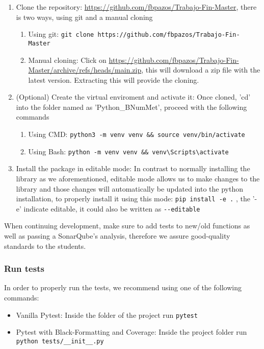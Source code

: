 \begin{enumerate}
       \item Clone the repository: \href{https://github.com/fbpazos/Trabajo-Fin-Master}{https://github.com/fbpazos/Trabajo-Fin-Master}, there is two ways, using git and a manual cloning
    \begin{enumerate}
        \item Using git: \lstinline|git clone https://github.com/fbpazos/Trabajo-Fin-Master|
        
        \item Manual cloning: Click on \href{https://github.com/fbpazos/Trabajo-Fin-Master/archive/refs/heads/main.zip}{https://github.com/fbpazos/Trabajo-Fin-Master/archive/refs/heads/main.zip}, this will download a zip file with the latest version. Extracting this will provide the cloning.
    \end{enumerate}

    \item (Optional) Create the virtual enviroment and activate it: Once cloned, 'cd' into the folder named as 'Python\_BNumMet', proceed with the following commands
    \begin{enumerate}
        \item Using CMD: \lstinline|python3 -m venv venv && source venv/bin/activate|
        \item Using Bash: \lstinline|python -m venv venv && venv\Scripts\activate|
    \end{enumerate}
    
    \item Install the package in editable mode: In contrast to normally installing the library as we aforementioned, editable mode allows us to make changes to the library and those changes will automatically be updated into the python installation, to properly install it using this mode: \lstinline|pip install -e .| , the '-e' indicate editable, it could also be written as \lstinline|--editable|

\end{enumerate}

When continuing development, make sure to add tests to new/old functions as well as passing a SonarQube's analysis, therefore we assure good-quality standards to the students.
\subsubsection{Run tests}
In order to properly run the tests, we recommend using one of the following commands:
\begin{itemize}
    \item Vanilla Pytest: Inside the folder of the project run \lstinline|pytest|
    \item Pytest with Black-Formatting and Coverage: Inside the project folder run \lstinline|python tests/__init__.py|
\end{itemize}





